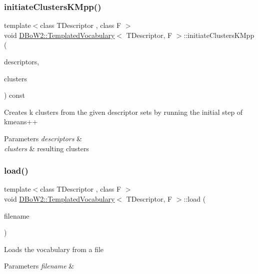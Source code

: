 \subsubsection{\texorpdfstring{initiate\+Clusters\+K\+Mpp()}{initiateClustersKMpp()}}
{\footnotesize\ttfamily template$<$class T\+Descriptor , class F $>$ \\
void \mbox{\hyperlink{class_d_bo_w2_1_1_templated_vocabulary}{D\+Bo\+W2\+::\+Templated\+Vocabulary}}$<$ T\+Descriptor, F $>$\+::initiate\+Clusters\+K\+Mpp (\begin{DoxyParamCaption}\item[{const vector$<$ \mbox{\hyperlink{class_d_bo_w2_1_1_templated_vocabulary_a40913d67e369e6993c2eab80a968f829}{p\+Descriptor}} $>$ \&}]{descriptors,  }\item[{vector$<$ T\+Descriptor $>$ \&}]{clusters }\end{DoxyParamCaption}) const\hspace{0.3cm}{\ttfamily [protected]}}

Creates k clusters from the given descriptor sets by running the initial step of kmeans++ 
\begin{DoxyParams}{Parameters}
{\em descriptors} & \\
\hline
{\em clusters} & resulting clusters \\
\hline
\end{DoxyParams}
\mbox{\label{class_d_bo_w2_1_1_templated_vocabulary_afdec2031c98b9109451b1454f73348b0}} 
\subsubsection{\texorpdfstring{load()}{load()}\hspace{0.1cm}{\footnotesize\ttfamily [1/2]}}
{\footnotesize\ttfamily template$<$class T\+Descriptor , class F $>$ \\
void \mbox{\hyperlink{class_d_bo_w2_1_1_templated_vocabulary}{D\+Bo\+W2\+::\+Templated\+Vocabulary}}$<$ T\+Descriptor, F $>$\+::load (\begin{DoxyParamCaption}\item[{const std\+::string \&}]{filename }\end{DoxyParamCaption})}

Loads the vocabulary from a file 
\begin{DoxyParams}{Parameters}
{\em filename} & \\
\hline
\end{DoxyParams}
\mbox{\label{class_d_bo_w2_1_1_templated_vocabulary_a037ba240314ff30f3620fb4de6845c66}} 
